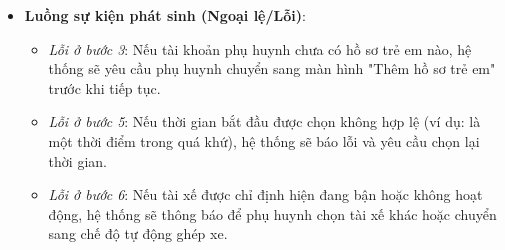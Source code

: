 \documentclass[../DoAn.tex]{subfiles}
\begin{document}
\begin{itemize}
\begin{enumerate}
          \end{enumerate}
    \item \textbf{Luồng sự kiện phát sinh (Ngoại lệ/Lỗi)}:
          \begin{itemize}
              \item \textit{Lỗi ở bước 3}: Nếu tài khoản phụ huynh chưa có hồ sơ trẻ em nào, hệ thống sẽ yêu cầu phụ huynh chuyển sang màn hình "Thêm hồ sơ trẻ em" trước khi tiếp tục.
              \item \textit{Lỗi ở bước 5}: Nếu thời gian bắt đầu được chọn không hợp lệ (ví dụ: là một thời điểm trong quá khứ), hệ thống sẽ báo lỗi và yêu cầu chọn lại thời gian.
              \item \textit{Lỗi ở bước 6}: Nếu tài xế được chỉ định hiện đang bận hoặc không hoạt động, hệ thống sẽ thông báo để phụ huynh chọn tài xế khác hoặc chuyển sang chế độ tự động ghép xe.
          \end{itemize}
\end{itemize}
\end{document}
